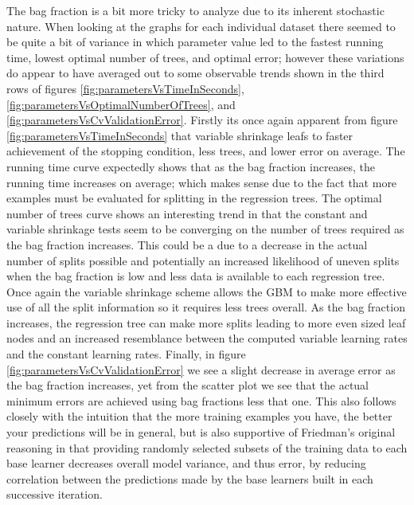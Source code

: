 \documentclass[9pt, conference]{IEEEtran}
\begin{document}
The bag fraction is a bit more tricky to analyze due to its inherent stochastic nature. When looking at the graphs for each individual dataset there seemed to be quite a bit of variance in which parameter value led to the fastest running time, lowest optimal number of trees, and optimal error; however these variations do appear to have averaged out to some observable trends shown in the third rows of figures \ref{fig:parametersVsTimeInSeconds},
\ref{fig:parametersVsOptimalNumberOfTrees}, and
\ref{fig:parametersVsCvValidationError}. Firstly its once again apparent from figure \ref{fig:parametersVsTimeInSeconds} that variable shrinkage leafs to faster achievement of the stopping condition, less trees, and lower error on average. The running time curve expectedly shows that as the bag fraction increases, the running time increases on average; which makes sense due to the fact that more examples must be evaluated for splitting in the regression trees. The optimal number of trees curve shows an interesting trend in that the constant and variable shrinkage tests seem to be converging on the number of trees required as the bag fraction increases. This could be a due to a decrease in the actual number of splits possible and potentially an increased likelihood of uneven splits when the bag fraction is low and less data is available to each regression tree. Once again the variable shrinkage scheme allows the GBM to make more effective use of all the split information so it requires less trees overall. As the bag fraction increases, the regression tree can make more splits leading to more even sized leaf nodes and an increased resemblance between the computed variable learning rates and the constant learning rates. Finally, in figure \ref{fig:parametersVsCvValidationError} we see a slight decrease in average error as the bag fraction increases, yet from the scatter plot we see that the actual minimum errors are achieved using bag fractions less that one. This also follows closely with the intuition that the more training examples you have, the better your predictions will be in general, but is also supportive of Friedman's original reasoning in \cite{2002Friedman} that providing randomly selected subsets of the training data to each base learner decreases overall model variance, and thus error, by reducing correlation between the predictions made by the base learners built in each successive iteration.
\end{document}

